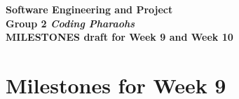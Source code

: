 \documentclass[11pt, a4paper]{article}
\begin{document}
\vspace*{15pt}

\begin{center}
\LARGE \bf Software Engineering and Project\\
Group 2 {\em Coding Pharaohs}\\
MILESTONES draft for Week 9 and Week 10

\end{center}

\vspace*{15pt}

\vspace*{15pt}

\section{Milestones for Week 9}
\end{document}
